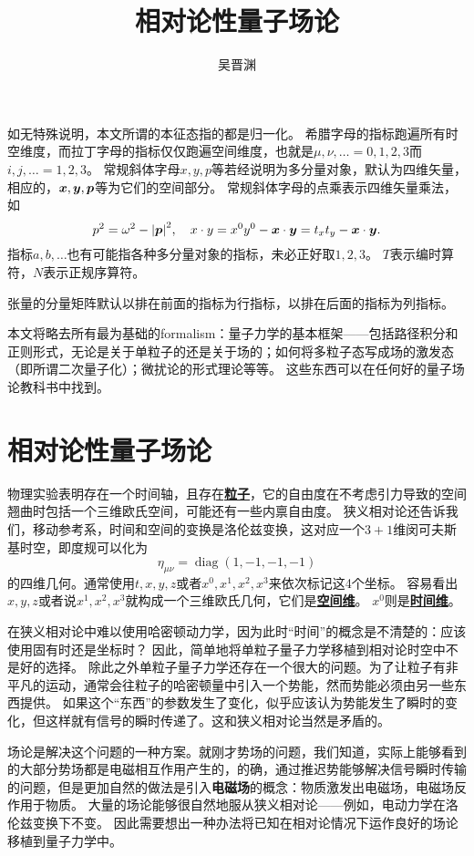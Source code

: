 \documentclass[hyperref, UTF8, a4paper]{ctexbook}
\title{相对论性量子场论}
\author{吴晋渊}
\DeclareMathOperator{\diag}{diag}
\newcommand{\concept}[1]{\underline{\textbf{#1}}}
\renewcommand{\emph}{\textbf}
\begin{document}
\maketitle

\vspace{2em}

如无特殊说明，本文所谓的本征态指的都是归一化。
希腊字母的指标跑遍所有时空维度，而拉丁字母的指标仅仅跑遍空间维度，也就是$\mu, \nu, \ldots = 0, 1, 2, 3$而$i, j, \ldots = 1, 2, 3$。
常规斜体字母$x, y, p$等若经说明为多分量对象，默认为四维矢量，相应的，$\vb*{x}, \vb*{y}, \vb*{p}$等为它们的空间部分。
常规斜体字母的点乘表示四维矢量乘法，如
\[
    p^2 = \omega^2 - \abs{\vb*{p}}^2, \quad x \cdot y = x^0 y^0 - \vb*{x} \cdot \vb*{y} = t_x t_y - \vb*{x} \cdot \vb*{y}.
\]
指标$a,b,\ldots$也有可能指各种多分量对象的指标，未必正好取$1, 2, 3$。
$T$表示编时算符，$N$表示正规序算符。

张量的分量矩阵默认以排在前面的指标为行指标，以排在后面的指标为列指标。

本文将略去所有最为基础的formalism：量子力学的基本框架——包括路径积分和正则形式，无论是关于单粒子的还是关于场的；如何将多粒子态写成场的激发态（即所谓二次量子化）；微扰论的形式理论等等。
这些东西可以在任何好的量子场论教科书中找到。

\part{相对论性量子场论}

物理实验表明存在一个时间轴，且存在\concept{粒子}，它的自由度在不考虑引力导致的空间翘曲时包括一个三维欧氏空间，可能还有一些内禀自由度。
狭义相对论还告诉我们，移动参考系，时间和空间的变换是洛伦兹变换，这对应一个$3+1$维闵可夫斯基时空，即度规可以化为
\[
    \eta_{\mu\nu} = \diag (1, -1, -1, -1)
\]
的四维几何。通常使用$t, x, y, z$或者$x^0, x^1, x^2, x^3$来依次标记这4个坐标。
容易看出$x, y, z$或者说$x^1, x^2, x^3$就构成一个三维欧氏几何，它们是\concept{空间维}。%
$x^0$则是\concept{时间维}。

在狭义相对论中难以使用哈密顿动力学，因为此时“时间”的概念是不清楚的：应该使用固有时还是坐标时？
因此，简单地将单粒子量子力学移植到相对论时空中不是好的选择。
除此之外单粒子量子力学还存在一个很大的问题。为了让粒子有非平凡的运动，通常会往粒子的哈密顿量中引入一个势能，然而势能必须由另一些东西提供。
如果这个“东西”的参数发生了变化，似乎应该认为势能发生了瞬时的变化，但这样就有信号的瞬时传递了。这和狭义相对论当然是矛盾的。

场论是解决这个问题的一种方案。就刚才势场的问题，我们知道，实际上能够看到的大部分势场都是电磁相互作用产生的，的确，通过推迟势能够解决信号瞬时传输的问题，但是更加自然的做法是引入\emph{电磁场}的概念：物质激发出电磁场，电磁场反作用于物质。
大量的场论能够很自然地服从狭义相对论——例如，电动力学在洛伦兹变换下不变。
因此需要想出一种办法将已知在相对论情况下运作良好的场论移植到量子力学中。
\end{document}
